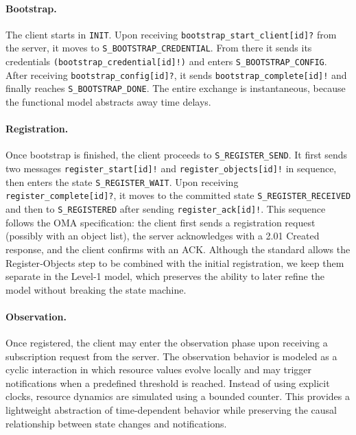 \documentclass[a4paper,fleqn]{cas-sc}
\begin{document}
\paragraph{Bootstrap.} The client starts in \texttt{INIT}. Upon receiving \texttt{bootstrap\_start\_client[id]?} from the server, it moves to \texttt{S\_BOOTSTRAP\_CREDENTIAL}. From there it sends its credentials \texttt{(bootstrap\_credential[id]!)} and enters \texttt{S\_BOOTSTRAP\_CONFIG}. After receiving \texttt{bootstrap\_config[id]?}, it sends \texttt{bootstrap\_complete[id]!} and finally reaches \texttt{S\_BOOTSTRAP\_DONE}. The entire exchange is instantaneous, because the functional model abstracts away time delays.

\paragraph{Registration.} Once bootstrap is finished, the client proceeds to \texttt{S\_REGISTER\_SEND}. It first sends two messages \texttt{register\_start[id]!} and \texttt{register\_objects[id]!} in sequence, then enters the state \texttt{S\_REGISTER\_WAIT}. Upon receiving \texttt{register\_complete[id]?}, it moves to the committed state \texttt{S\_REGISTER\_RECEIVED} and then to \texttt{S\_REGISTERED} after sending \texttt{register\_ack[id]!}. This sequence follows the OMA specification: the client first sends a registration request (possibly with an object list), the server acknowledges with a 2.01 Created response, and the client confirms with an ACK. Although the standard allows the Register‑Objects step to be combined with the initial registration, we keep them separate in the Level‑1 model, which preserves the ability to later refine the model without breaking the state machine.

\paragraph{Observation.} Once registered, the client may enter the observation phase upon receiving a subscription request from the server. The observation behavior is modeled as a cyclic interaction in which resource values evolve locally and may trigger notifications when a predefined threshold is reached. Instead of using explicit clocks, resource dynamics are simulated using a bounded counter. This provides a lightweight abstraction of time-dependent behavior while preserving the causal relationship between state changes and notifications.
\end{document}
